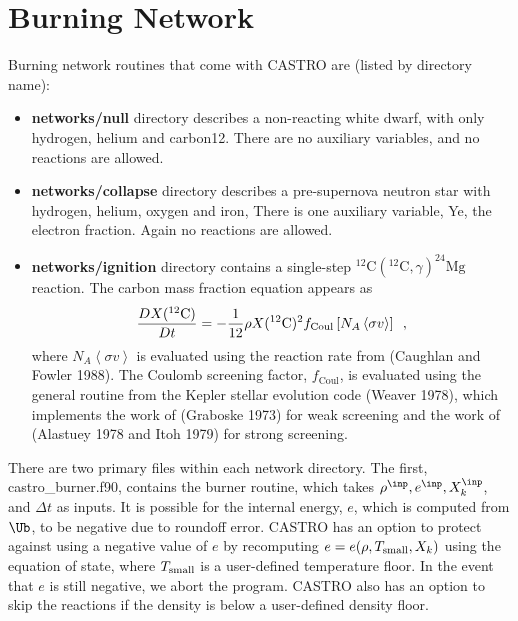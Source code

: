 \section{Burning Network}
Burning network routines that come with CASTRO are (listed by directory name):
\begin{itemize}
\item {\bf networks/null} directory describes a non-reacting white dwarf,
with only hydrogen, helium and carbon12.   There are
no auxiliary variables, and no reactions are allowed.
\item {\bf networks/collapse} directory describes a pre-supernova neutron
star with hydrogen, helium, oxygen and iron, There is one auxiliary
variable, Ye, the electron fraction.  Again no reactions are
allowed.
\item {\bf networks/ignition} directory contains a single-step
$^{12}\mathrm{C}(^{12}\mathrm{C},\gamma)^{24}\mathrm{Mg}$ reaction.
The carbon mass fraction equation appears as
\begin{equation}
\frac{D X(^{12}\mathrm{C})}{Dt} = - \frac{1}{12} \rho X(^{12}\mathrm{C})^2
    f_\mathrm{Coul} \left [N_A \left <\sigma v \right > \right]\enskip,
\end{equation}
where $N_A \left <\sigma v\right>$ is evaluated using the reaction
rate from (Caughlan and Fowler 1988).  The Coulomb screening factor,
$f_\mathrm{Coul}$, is evaluated using the general routine from the
Kepler stellar evolution code (Weaver 1978), which implements
the work of (Graboske 1973) for weak screening and the work of
(Alastuey 1978 and Itoh 1979) for strong screening.
\end{itemize}

There are two primary files within each network directory. The first,
castro\_burner.f90, contains the burner routine, 
which takes $\rho^\inp, e^\inp, X_k^\inp$, and $\Delta t$ as inputs.
It is possible for the internal energy, $e$, which is computed from $\Ub$, to be
negative due to roundoff error.  CASTRO has an option to protect against using a 
negative value of $e$ by recomputing $e = e(\rho,T_{\rm small},X_k)$ using the 
equation of state, where $T_{\rm small}$ is a user-defined temperature floor.  In the 
event that $e$ is still negative, we abort the program.  CASTRO also has an option to
skip the reactions if the density is below a user-defined density floor.

